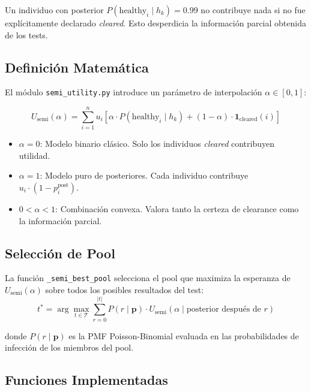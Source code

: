 \documentclass[11pt, a4paper]{article}
\begin{document}
Un individuo con posterior $P(\text{healthy}_i \mid h_k) = 0.99$ no
contribuye nada si no fue expl\'icitamente declarado \textit{cleared}.
Esto desperdicia la informaci\'on parcial obtenida de los tests.

\subsection{Definici\'on Matem\'atica}
El m\'odulo \texttt{semi\_utility.py} introduce un par\'ametro de
interpolaci\'on $\alpha \in [0, 1]$:

\begin{equation}
    U_{\text{semi}}(\alpha) = \sum_{i=1}^{n} u_i \left[
        \alpha \cdot P(\text{healthy}_i \mid h_k) +
        (1 - \alpha) \cdot \mathbf{1}_{\text{cleared}}(i)
    \right]
\end{equation}

\begin{itemize}[nosep]
    \item $\alpha = 0$: Modelo binario cl\'asico. Solo los individuos
    \textit{cleared} contribuyen utilidad.
    \item $\alpha = 1$: Modelo puro de posteriores. Cada individuo
    contribuye $u_i \cdot (1 - p_i^{\text{post}})$.
    \item $0 < \alpha < 1$: Combinaci\'on convexa. Valora tanto la
    certeza de clearance como la informaci\'on parcial.
\end{itemize}

\subsection{Selecci\'on de Pool}
La funci\'on \texttt{\_semi\_best\_pool} selecciona el pool que maximiza
la esperanza de $U_{\text{semi}}(\alpha)$ sobre todos los posibles
resultados del test:
\begin{equation}
    t^* = \arg\max_{t \in \mathcal{T}} \sum_{r=0}^{|t|}
    P(r \mid \mathbf{p}) \cdot U_{\text{semi}}(\alpha \mid
    \text{posterior despu\'es de } r)
\end{equation}

donde $P(r \mid \mathbf{p})$ es la PMF Poisson-Binomial evaluada en
las probabilidades de infecci\'on de los miembros del pool.

\subsection{Funciones Implementadas}
\end{document}
